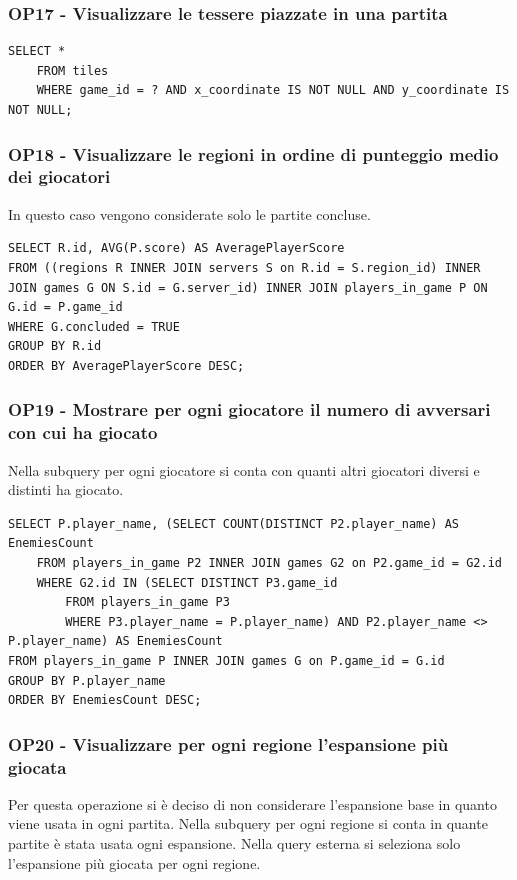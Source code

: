 \subsubsection*{OP17 - Visualizzare le tessere piazzate in una partita}
\begin{lstlisting}[style=sql]
    SELECT *
    FROM tiles
    WHERE game_id = ? AND x_coordinate IS NOT NULL AND y_coordinate IS NOT NULL;
\end{lstlisting}

\subsubsection*{OP18 - Visualizzare le regioni in ordine di punteggio medio dei giocatori}
In questo caso vengono considerate solo le partite concluse.
\medskip

\begin{lstlisting}[style=sql]
SELECT R.id, AVG(P.score) AS AveragePlayerScore
FROM ((regions R INNER JOIN servers S on R.id = S.region_id) INNER JOIN games G ON S.id = G.server_id) INNER JOIN players_in_game P ON G.id = P.game_id
WHERE G.concluded = TRUE
GROUP BY R.id
ORDER BY AveragePlayerScore DESC;
\end{lstlisting}

\subsubsection*{OP19 - Mostrare per ogni giocatore il numero di avversari con cui ha giocato}
Nella subquery per ogni giocatore si conta con quanti altri giocatori diversi e distinti ha giocato.
\medskip

\begin{lstlisting}[style=sql]
SELECT P.player_name, (SELECT COUNT(DISTINCT P2.player_name) AS EnemiesCount
    FROM players_in_game P2 INNER JOIN games G2 on P2.game_id = G2.id
    WHERE G2.id IN (SELECT DISTINCT P3.game_id
        FROM players_in_game P3
        WHERE P3.player_name = P.player_name) AND P2.player_name <> P.player_name) AS EnemiesCount
FROM players_in_game P INNER JOIN games G on P.game_id = G.id
GROUP BY P.player_name
ORDER BY EnemiesCount DESC;
\end{lstlisting}

\subsubsection*{OP20 - Visualizzare per ogni regione l'espansione più giocata}
Per questa operazione si è deciso di non considerare l'espansione base in quanto viene usata in ogni partita. Nella subquery per ogni regione si conta in quante partite è stata usata ogni espansione. Nella query esterna si seleziona solo l'espansione più giocata per ogni regione.
\medskip

